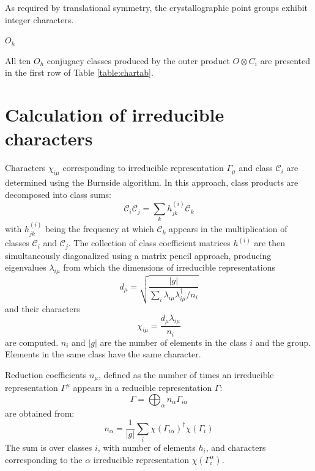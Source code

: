 \documentclass[twocolumn,showpacs,preprintnumbers,superscriptaddress,prb,floatfix,aps,10pt]{revtex4-1}
\newcommand*{\class}{\mathcal{C}}
\begin{document}
As required by translational symmetry, the crystallographic point groups exhibit integer characters.





$O_h$



All ten $O_h$ conjugacy classes produced by the outer product $O \otimes C_i$ are presented in the first row of Table \ref{table:chartab}.


\section{Calculation of irreducible characters}
\label{appendix:chartab}
Characters $\chi_{i\mu}$ corresponding to irreducible representation $\Gamma_\mu$ and class $\class_i$ are determined using the Burnside algorithm.\cite{burnside_theory_2010,mckay_construction_1970,unger_computing_2006,schneider_dixons_1990,dixon_high_1967} In this approach, class products are decomposed into class sums:
\begin{equation}
\label{eq:class_coefficients}
\class_i \class_j = \sum_k h_{jk}^{(i)} \class_k
\end{equation}
with $h_{jk}^{(i)}$ being the frequency at which $\class_k$ appears in the multiplication of classes $\class_i$ and $\class_j$. The collection of class coefficient matrices $h^{(i)}$ are then simultaneously diagonalized using a matrix pencil approach, producing eigenvalues $\lambda_{i\mu}$ from which the dimensions of irreducible representations
\begin{equation}
\label{eq:irrep_dimension}
d_\mu = \sqrt{ \frac{|g|}{\sum_i \lambda_{i\mu} \lambda^{\dag}_{i\mu} / n_i }  }
\end{equation}
and their characters
\begin{equation}
\label{eq:irrep_characters}
\chi_{i\mu} = \frac{d_\mu \lambda_{i\mu}}{n_i}
\end{equation}
are computed. $n_i$ and $|g|$ are the number of elements in the class $i$ and the group. Elements in the same class have the same character.

Reduction coefficients $n_\mu$, defined as the number of times an irreducible representation $\Gamma^\mu$ appears in a reducible representation $\Gamma$:
\begin{equation}
\label{eq:irrep_decomposition}
\Gamma = \bigoplus_\alpha n_\alpha \Gamma_{i\alpha}
\end{equation}
are obtained from:
\begin{equation}
\label{eq:irrep_decomposition_coefficients}
n_\alpha = \frac{1}{|g|} \sum_i \chi\left(\Gamma_{i\alpha}\right)^\dag \chi\left(\Gamma_i\right)
\end{equation}
The sum is over classes $i$, with number of elements $h_i$, and characters corresponding to the $\alpha$ irreducible representation $\chi(\Gamma_i^\alpha)$.
\end{document}
